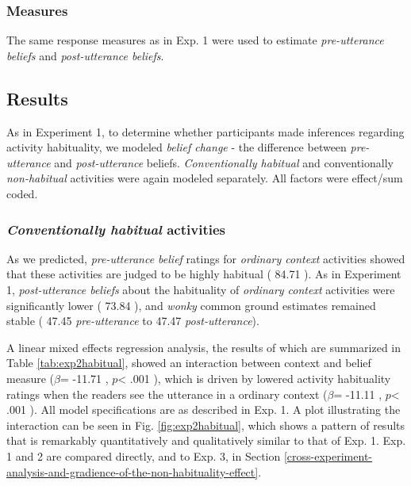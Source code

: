 \documentclass{sp}\usepackage[]{graphicx}\usepackage[]{color}
\begin{document}
\subsubsection{Measures}

The same response measures as in Exp. 1 were used to estimate \textit{pre-utterance beliefs} and \textit{post-utterance beliefs}. 

\subsection{Results}


As in Experiment 1, to determine whether participants made inferences regarding activity habituality, we modeled \textit{belief change} - the difference between \textit{pre-utterance} and \textit{post-utterance} beliefs. \textit{Conventionally habitual} and conventionally \textit{non-habitual} activities were again modeled separately. All factors were effect/sum coded. 

\subsubsection{\textit{Conventionally habitual} activities}

As we predicted, \textit{pre-utterance belief} ratings for \textit{ordinary context} activities showed that these activities are judged to be highly habitual (%
84.71
). As in Experiment 1, \textit{post-utterance beliefs} about the habituality of \textit{ordinary context} activities were significantly lower (%
73.84
), and \textit{wonky} common ground estimates remained stable (%
47.45
 \textit{pre-utterance} to %
47.47
 \textit{post-utterance}).

A linear mixed effects regression analysis, the results of which are summarized in Table \ref{tab:exp2habitual}, showed an interaction between context and belief measure ($\beta$=%
-11.71
, $p$<%
.001
), which is driven by lowered activity habituality ratings when the readers see the utterance in a ordinary context ($\beta$=%
-11.11
, $p$<%
.001
). All model specifications are as described in Exp. 1.  A plot illustrating the interaction can be seen in Fig. \ref{fig:exp2habitual}, which shows a pattern of results that is remarkably quantitatively and qualitatively similar to that of Exp. 1.  Exp. 1 and 2 are compared directly, and to Exp. 3, in Section \ref{cross-experiment-analysis-and-gradience-of-the-non-habituality-effect}.
\end{document}
